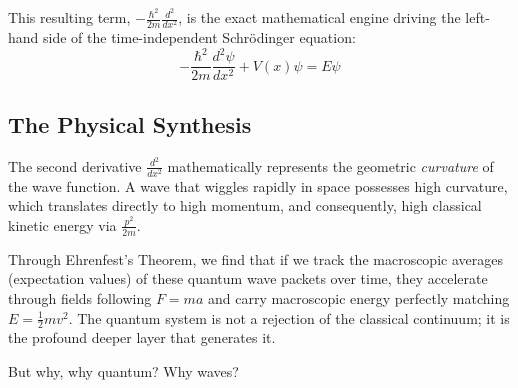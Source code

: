 This resulting term, $-\frac{\hbar^2}{2m}\frac{d^2}{dx^2}$, is the exact mathematical engine driving the left-hand side of the time-independent Schrödinger equation:
\begin{equation}
    -\frac{\hbar^2}{2m}\frac{d^2\psi}{dx^2} + V(x)\psi = E\psi
\end{equation}

\subsection*{The Physical Synthesis}
The second derivative $\frac{d^2}{dx^2}$ mathematically represents the geometric \textit{curvature} of the wave function.
A wave that wiggles rapidly in space possesses high curvature, which translates directly to high momentum, and consequently, high classical kinetic energy via $\frac{p^2}{2m}$. 

Through Ehrenfest's Theorem, we find that if we track the macroscopic averages (expectation values) of these quantum wave packets over time, they accelerate through fields following $F=ma$ and carry macroscopic energy perfectly matching $E = \frac{1}{2}mv^2$.
The quantum system is not a rejection of the classical continuum; it is the profound deeper layer that generates it.

But why, why quantum? Why waves? 
